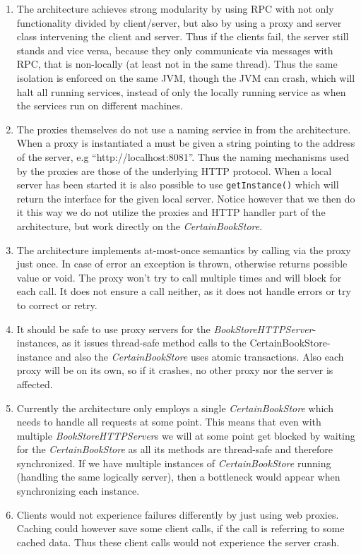 \documentclass[a4paper, 11pt]{article}
\begin{document}
\begin{enumerate}
    \item The architecture achieves strong modularity by using RPC with not only functionality divided by client/server, but also by using a proxy and server class intervening the client and server.
Thus if the clients fail, the server still stands and vice versa, because they only communicate via messages with RPC, that is non-locally (at least not in the same thread). Thus the same isolation is enforced on the same JVM, though the JVM can crash, which will halt all running services, instead of only the locally running service as when the services run on different machines.
    \item The proxies themselves do not use a naming service in from the architecture. When a proxy is instantiated a must be given a string pointing to the address of the server, e.g ``http://localhost:8081''. Thus the naming mechanisms used by the proxies are those of the underlying HTTP protocol. When a local server has been started it is also possible to use \texttt{getInstance()} which will return the interface for the given local server. Notice however that we then do it this way we do not utilize the proxies and HTTP handler part of the architecture, but work directly on the \textit{CertainBookStore}. 
    \item The architecture implements at-most-once semantics by calling via the proxy just once. In case of error an exception is thrown, otherwise returns possible value or void. The proxy won't try to call multiple times and will block for each call. It does not ensure a call neither, as it does not handle errors or try to correct or retry.
    \item It should be safe to use proxy servers for the \textit{BookStoreHTTPServer}-instances, as it issues thread-safe method calls to the CertainBookStore-instance and also the  \textit{CertainBookStore} uses atomic transactions. Also each proxy will be on its own, so if it crashes, no other proxy nor the server is affected.
    \item Currently the architecture only employs a single \textit{CertainBookStore} which needs to handle all requests at some point. This means that even with multiple \textit{BookStoreHTTPServer}s we will at some point get blocked by waiting for the \textit{CertainBookStore} as all its methods are thread-safe and therefore synchronized.
If we have multiple instances of \textit{CertainBookStore} running (handling the same logically server), then a bottleneck would appear when synchronizing each instance.
    \item Clients would not experience failures differently by just using web proxies. Caching could however save some client calls, if the call is referring to some cached data. Thus these client calls would not experience the server crash.
\end{enumerate}

\end{document}

